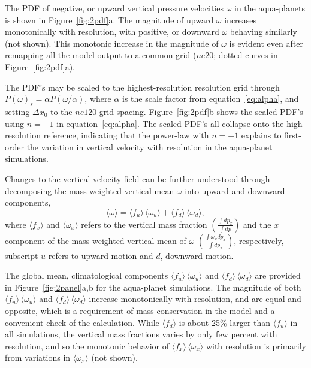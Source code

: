 \documentclass[times]{qjrms4}
\begin{document}
The PDF of negative, or upward vertical pressure velocities $\omega$ in the aqua-planets is shown in Figure~\ref{fig:2pdf}a. The magnitude of upward $\omega$ increases monotonically with resolution, with positive, or downward $\omega$ behaving similarly (not shown). This monotonic increase in the magnitude of $\omega$ is evident even after remapping all the model output to a common grid ($ne20$; dotted curves in Figure~\ref{fig:2pdf}a).

The PDF's may be scaled to the highest-resolution resolution grid through $P(\omega)_s = \alpha P (\omega / \alpha)$, where $\alpha$ is the scale factor from equation~\ref{eq:alpha}, and setting $\Delta x_0$ to the $ne120$ grid-spacing. Figure~\ref{fig:2pdf}b shows the scaled PDF's using $n=-1$ in equation~\ref{eq:alpha}. The scaled PDF's all collapse onto the high-resolution reference, indicating that the power-law with $n=-1$ explains to first-order the variation in vertical velocity with resolution in the aqua-planet simulations. 

Changes to the vertical velocity field can be further understood through decomposing the mass weighted vertical mean $\omega$ into upward and downward components,
\begin{equation}
\langle \omega \rangle =\langle f_{u} \rangle \, \langle \omega_{u} \rangle + \langle f_{d} \rangle \, \langle \omega_{d} \rangle, \label{eq:omega}
\end{equation}
where $\langle f_x \rangle$ and $\langle \omega_x \rangle$ refers to the vertical mass fraction $ \left( \frac{\int dp_x}{\int dp} \right)$ and the $x$ component of the mass weighted vertical mean of $\omega$ $ \left( \frac{\int \omega_x dp_x}{\int dp_x} \right)$, respectively, subscript $u$ refers to upward motion and $d$, downward motion.

The global mean, climatological components $\langle f_{u} \rangle \, \langle \omega_{u} \rangle$ and $\langle f_{d} \rangle \, \langle \omega_{d} \rangle$ are provided in Figure~\ref{fig:2panel}a,b for the aqua-planet simulations. The magnitude of both $\langle f_{u} \rangle \, \langle \omega_{u} \rangle$ and $\langle f_{d} \rangle \, \langle \omega_{d} \rangle$ increase monotonically with resolution, and are equal and opposite, which is a requirement of mass conservation in the model and a convenient check of the calculation. While $\langle f_{d} \rangle$ is about 25\% larger than $\langle f_{u} \rangle$ in all simulations, the vertical mass fractions varies by only few percent with resolution, and so the monotonic behavior of $\langle f_{x} \rangle \, \langle \omega_{x} \rangle$ with resolution is primarily from variations in $ \langle \omega_{x} \rangle$ (not shown).
\end{document}
